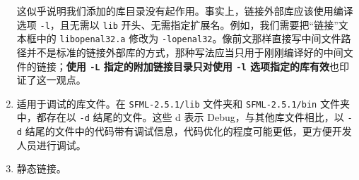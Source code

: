 \begin{enumerate}
	这似乎说明我们添加的库目录没有起作用。事实上，链接外部库应该使用编译选项 \lstinline[language={}]{-l}，且无需以 \lstinline[language={}]{lib} 开头、无需指定扩展名。例如，我们需要把“链接”文本框中的 \lstinline[language={}]{libopenal32.a} 修改为 \lstinline[language={}]{-lopenal32}。像前文那样直接写中间文件路径并不是标准的链接外部库的方式，那种写法应当只用于刚刚编译好的中间文件的链接；\textbf{使用 \lstinline[language={}]{-L} 指定的附加链接目录只对使用 \lstinline[language={}]{-l} 选项指定的库有效}也印证了这一观点。

	\item 适用于调试的库文件。在 \lstinline[language={}]{SFML-2.5.1/lib} 文件夹和 \lstinline[language={}]{SFML-2.5.1/bin} 文件夹中，都存在以 \lstinline[language={}]{-d} 结尾的文件。这些 d 表示 Debug，与其他库文件相比，以 \lstinline[language={}]{-d} 结尾的文件中的代码带有调试信息，代码优化的程度可能更低，更方便开发人员进行调试。

	\item 静态链接。
\end{enumerate}
